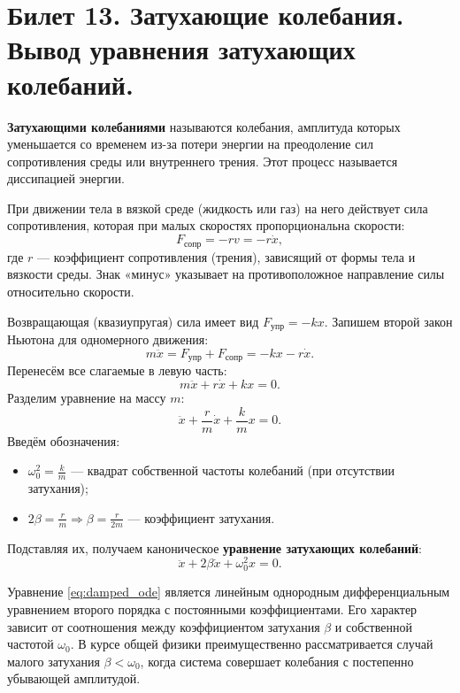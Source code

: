 \section{Билет 13. Затухающие колебания. Вывод уравнения затухающих колебаний.}

\begin{definition}
\textbf{Затухающими колебаниями} называются колебания, амплитуда которых уменьшается со временем из-за потери энергии на преодоление сил сопротивления среды или внутреннего трения. Этот процесс называется диссипацией энергии.
\end{definition}

\begin{theorem}
При движении тела в вязкой среде (жидкость или газ) на него действует сила сопротивления, которая при малых скоростях пропорциональна скорости:
\begin{equation}
    F_{\text{сопр}} = -r v = -r \dot{x}, \label{eq:friction_13}
\end{equation}
где $r$ --- коэффициент сопротивления (трения), зависящий от формы тела и вязкости среды. Знак «минус» указывает на противоположное направление силы относительно скорости.

Возвращающая (квазиупругая) сила имеет вид $F_{\text{упр}} = -kx$. Запишем второй закон Ньютона для одномерного движения:
\begin{equation}
    m \ddot{x} = F_{\text{упр}} + F_{\text{сопр}} = -kx - r\dot{x}.
\end{equation}
Перенесём все слагаемые в левую часть:
\begin{equation}
    m \ddot{x} + r \dot{x} + kx = 0.
\end{equation}
Разделим уравнение на массу $m$:
\begin{equation}
    \ddot{x} + \frac{r}{m} \dot{x} + \frac{k}{m} x = 0.
\end{equation}
Введём обозначения:
\begin{itemize}
    \item $\omega_0^2 = \frac{k}{m}$ --- квадрат собственной частоты колебаний (при отсутствии затухания);
    \item $2\beta = \frac{r}{m} \Rightarrow \beta = \frac{r}{2m}$ --- коэффициент затухания.
\end{itemize}
Подставляя их, получаем каноническое \textbf{уравнение затухающих колебаний}:
\begin{equation}
    \ddot{x} + 2\beta \dot{x} + \omega_0^2 x = 0. \label{eq:damped_ode}
\end{equation}
\end{theorem}

\begin{remark}
Уравнение \eqref{eq:damped_ode} является линейным однородным дифференциальным уравнением второго порядка с постоянными коэффициентами. Его характер зависит от соотношения между коэффициентом затухания $\beta$ и собственной частотой $\omega_0$. В курсе общей физики преимущественно рассматривается случай малого затухания $\beta < \omega_0$, когда система совершает колебания с постепенно убывающей амплитудой.
\end{remark}
